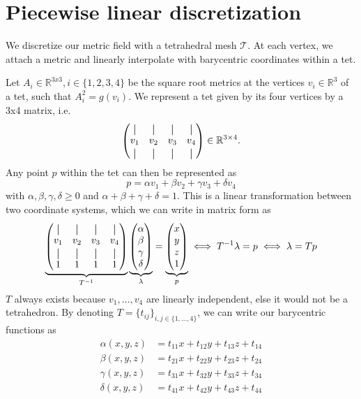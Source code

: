 \documentclass[../thesis.tex]{subfiles}
\begin{document}
\section{Piecewise linear discretization}
We discretize our metric field with a tetrahedral mesh $\mathcal{T}$.
At each vertex, we attach a metric and linearly interpolate with barycentric coordinates within a tet.

Let $A_i \in \mathbb{R}^{3x3}, i \in \{1,2,3,4\}$ be the square root metrics at the vertices $v_i \in \mathbb{R}^3$ of a tet, such that
$A^2_i = g(v_i)$. We represent a tet given by its four vertices by a 3x4 matrix, i.e.
$$\begin{pmatrix}
  \vertbar & \vertbar & \vertbar & \vertbar \\
  v_1 & v_2 & v_3 & v_4 \\
  \vertbar & \vertbar & \vertbar & \vertbar
\end{pmatrix} \in \mathbb{R}^{3\times 4}.$$
Any point $p$ within the tet can then be represented as
$$p = \alpha v_1 + \beta v_2 + \gamma v_3 + \delta v_4$$
with $\alpha, \beta, \gamma, \delta \ge 0$ and $\alpha + \beta + \gamma + \delta = 1$.
This is a linear transformation between two coordinate systems, which we can write in matrix form as
$$\underbrace{\begin{pmatrix}
  \vertbar & \vertbar & \vertbar & \vertbar \\
  v_1 & v_2 & v_3 & v_4 \\
  \vertbar & \vertbar & \vertbar & \vertbar \\
  1 & 1 & 1 & 1
\end{pmatrix}}_{T^{-1}}
\underbrace{
\begin{pmatrix}
  \alpha \\ \beta \\ \gamma \\ \delta
\end{pmatrix}}_{\lambda} = \underbrace{\begin{pmatrix}
  x \\ y \\ z \\ 1 
\end{pmatrix}}_{p}
\iff
T^{-1}\lambda = p \iff  \lambda = Tp
$$
$T$ always exists because $v_1, \dots , v_4$ are linearly independent,
else it would not be a tetrahedron.
By denoting $T= \{ t_{ij} \}_{i,j \in \{ 1,\dots, 4\} }$, we can write our barycentric functions as
\begin{align*}
\alpha(x,y,z) &= t_{11}x + t_{12}y + t_{13}z + t_{14} \\
\beta(x,y,z) &= t_{21}x + t_{22}y + t_{23}z + t_{24} \\
\gamma(x,y,z) &= t_{31}x + t_{32}y + t_{33}z + t_{34} \\
\delta(x,y,z) &= t_{41}x + t_{42}y + t_{43}z + t_{44}
\end{align*}
\end{document}
